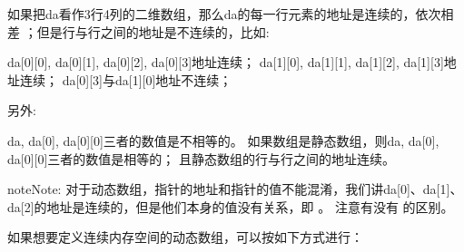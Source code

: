 \documentclass[letterpaper,10pt,english]{sphinxmanual}
\begin{document}
%
\begin{sphinxVerbatim}[commandchars=\\\{\}]
\PYG{p}{[}\PYG{p}{]}  \PYG{p}{[}\PYG{p}{]}  \PYG{p}{[}\PYG{p}{]}
\end{sphinxVerbatim}

如果把da看作3行4列的二维数组，那么da的每一行元素的地址是连续的，依次相差  ；但是行与行之间的地址是不连续的，比如:

%
\begin{sphinxVerbatim}[commandchars=\\\{\}]
da[0][0], da[0][1], da[0][2], da[0][3]地址连续；
da[1][0], da[1][1], da[1][2], da[1][3]地址连续；
da[0][3]与da[1][0]地址不连续；
\end{sphinxVerbatim}

另外:

%
\begin{sphinxVerbatim}[commandchars=\\\{\}]
\PYGZam{}da, \PYGZam{}da[0], \PYGZam{}da[0][0]三者的数值是不相等的。
如果数组是静态数组，则\PYGZam{}da, \PYGZam{}da[0], \PYGZam{}da[0][0]三者的数值是相等的；
且静态数组的行与行之间的地址连续。
\end{sphinxVerbatim}

\begin{sphinxadmonition}{note}{Note:}
对于动态数组，指针的地址和指针的值不能混淆，我们讲da{[}0{]}、da{[}1{]}、da{[}2{]}的地址是连续的，但是他们本身的值没有关系，即  。
注意有没有 \sphinxcode{\sphinxupquote{\&}} 的区别。
\end{sphinxadmonition}

如果想要定义连续内存空间的动态数组，可以按如下方式进行：
\end{document}
